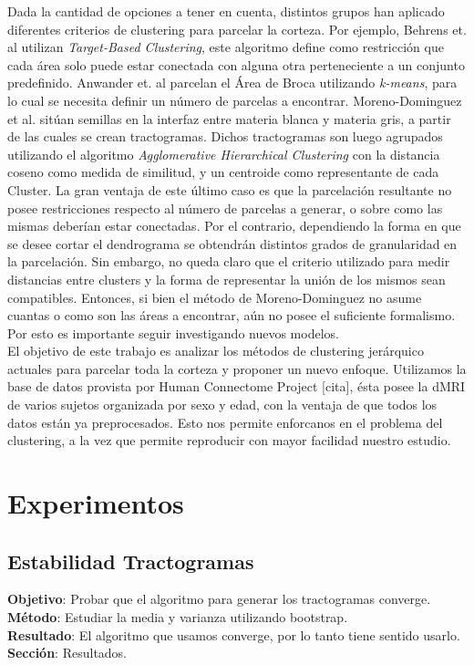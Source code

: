 Dada la cantidad de opciones a tener en cuenta, distintos grupos han aplicado
diferentes criterios de clustering para parcelar la corteza. Por ejemplo, Behrens
et. al \cite{Behrens2003} utilizan \textit{Target-Based Clustering}, este algoritmo
define como restricci\'on que cada \'area solo puede estar conectada con alguna
otra perteneciente a un conjunto predefinido. Anwander et. al \cite{Anwander2006} 
parcelan el \'Area de Broca utilizando \textit{k-means}, para lo cual se necesita
definir un n\'umero de parcelas a encontrar. Moreno-Dominguez et al. 
\cite{Moreno-Dominguez2014} sit\'uan semillas en la interfaz entre materia blanca
y materia gris, a partir de las cuales se crean tractogramas. Dichos tractogramas
son luego agrupados utilizando el algoritmo \textit{Agglomerative Hierarchical
Clustering} con la distancia coseno como medida de similitud, y un centroide como
representante de cada Cluster. La gran ventaja de este \'ultimo caso es que la
parcelaci\'on resultante no posee restricciones respecto al n\'umero de parcelas
a generar, o sobre como las mismas deber\'ian estar conectadas. Por el contrario,
dependiendo la forma en que se desee cortar el dendrograma se obtendr\'an
distintos grados de granularidad en la parcelaci\'on. Sin embargo, no queda claro
que el criterio utilizado para medir distancias entre clusters y la forma de
representar la uni\'on de los mismos sean compatibles. Entonces, si bien el
m\'etodo de Moreno-Dominguez no asume cuantas o como son las \'areas a encontrar,
a\'un no posee el suficiente formalismo. Por esto es importante seguir investigando
nuevos modelos.  \\

El objetivo de este trabajo es analizar los m\'etodos de clustering jer\'arquico
actuales para parcelar toda la corteza y proponer un nuevo enfoque. Utilizamos
la base de datos provista por Human Connectome Project [cita], \'esta posee la
dMRI de varios sujetos organizada por sexo y edad, con la ventaja de que todos
los datos est\'an ya preprocesados. Esto nos permite enforcanos en el problema
del clustering, a la vez que permite reproducir con mayor facilidad nuestro 
estudio. \\

\section{Experimentos}

\subsection{Estabilidad Tractogramas}
\textbf{Objetivo}: Probar que el algoritmo para generar los tractogramas converge.\\
\textbf{M\'etodo}: Estudiar la media y varianza utilizando bootstrap. \\
\textbf{Resultado}: El algoritmo que usamos converge, por lo tanto tiene sentido
                    usarlo.\\
\textbf{Secci\'on}: Resultados.\\
                    
